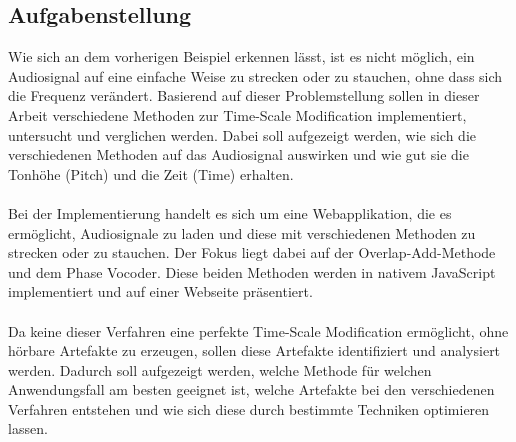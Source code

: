 \subsection{Aufgabenstellung}
Wie sich an dem vorherigen Beispiel erkennen lässt, ist es nicht möglich, ein Audiosignal auf eine einfache Weise zu strecken oder zu stauchen, ohne dass sich die Frequenz verändert. Basierend auf dieser Problemstellung sollen in dieser Arbeit verschiedene Methoden zur Time-Scale Modification implementiert, untersucht und verglichen werden. Dabei soll aufgezeigt werden, wie sich die verschiedenen Methoden auf das Audiosignal auswirken und wie gut sie die Tonhöhe (Pitch) und die Zeit (Time) erhalten.

\paragraph{} 
Bei der Implementierung handelt es sich um eine Webapplikation, die es ermöglicht, Audiosignale zu laden und diese mit verschiedenen Methoden zu strecken oder zu stauchen. Der Fokus liegt dabei auf der Overlap-Add-Methode und dem Phase Vocoder. Diese beiden Methoden werden in nativem JavaScript implementiert und auf einer Webseite präsentiert.

\paragraph{} 
Da keine dieser Verfahren eine perfekte Time-Scale Modification ermöglicht, ohne hörbare Artefakte zu erzeugen, sollen diese Artefakte identifiziert und analysiert werden. Dadurch soll aufgezeigt werden, welche Methode für welchen Anwendungsfall am besten geeignet ist, welche Artefakte bei den verschiedenen Verfahren entstehen und wie sich diese durch bestimmte Techniken optimieren lassen.